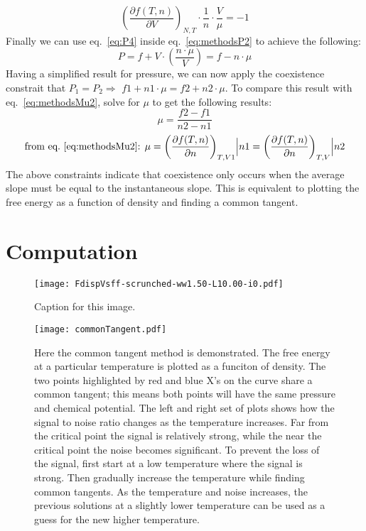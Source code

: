 \begin{equation}\label{eq:P4}
\left(\frac{\partial f(T,n)}{\partial V}\right)_{N,T} \cdot \frac{1}{n} \cdot \frac{V}{\mu}=-1
\end{equation}
Finally we can use eq.~\ref{eq:P4} inside eq.~\ref{eq:methodsP2} to achieve the following:
\begin{equation}\label{eq:P5}
P=f+V\cdot\left( \frac{n\cdot \mu}{V} \right)=f-n\cdot\mu
\end{equation}
Having a simplified result for pressure, we can now apply the coexistence constrait that $P_1=P_2 \Rightarrow$ $f1+n1\cdot\mu=f2+n2\cdot\mu$. To compare this result with eq.~\ref{eq:methodsMu2}, solve for $\mu$ to get the following results:
\begin{equation}\label{eq:mu3p}
\mu=\frac{f2-f1}{n2-n1}
\end{equation}
\begin{equation}\label{eq:mu3}
\text{from eq.~\ref{eq:methodsMu2}: }\mu= \left(\frac{\partial f(T,n)}{\partial n}\right)_{T,V1}\Bigr|n1=\left(\frac{\partial f(T,n)}{\partial n}\right)_{T,V}\Bigr|n2
\end{equation}
The above constraints indicate that coexistence only occurs when the average slope must be equal to the instantaneous slope. This is equivalent to plotting the free energy as a function of density and finding a common tangent.

\section{Computation}
\begin{figure}[h]
\vspace*{-7mm}
\hspace*{-6mm}
	\centering
	\texttt{[image: FdispVsff-scrunched-ww1.50-L10.00-i0.pdf]}
	\caption{Caption for this image.}
	\label{fig:FdispVsff}
\end{figure}

\begin{figure}[h]
\vspace*{-7mm}
\hspace*{-6mm}
	\centering
	\texttt{[image: commonTangent.pdf]}
	\caption{\scriptsize Here the common tangent method is demonstrated. The free energy at a particular temperature is plotted as a funciton of density. The two points highlighted by red and blue X's on the curve share a common tangent; this means both points will have the same pressure and chemical potential. The left and right set of plots shows how the signal to noise ratio changes as the temperature increases. Far from the critical point the signal is relatively strong, while the near the critical point the noise becomes significant. To prevent the loss of the signal, first start at a low temperature where the signal is strong. Then gradually increase the temperature while finding common tangents. As the temperature and noise increases, the previous solutions at a slightly lower temperature can be used as a guess for the new higher temperature.}
	\label{fig:FdispVsff}
\end{figure}




